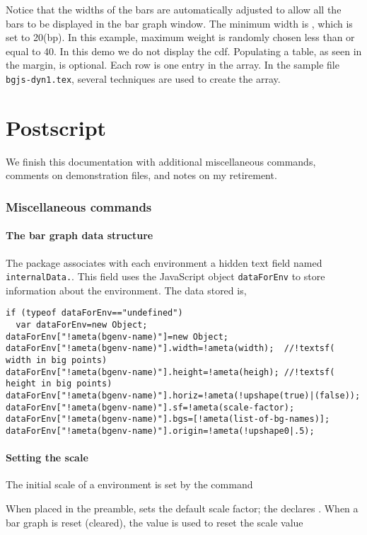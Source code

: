 \documentclass{article}
\let\uif\textsf
\begin{document}
Notice that the widths of the bars
  are automatically adjusted to allow all the bars to be displayed in the bar graph window. The minimum
  width is , which is set to 20(bp). In this example, maximum weight is randomly chosen less
  than or equal to 40. In this demo we do not display the \uif{cdf}. Populating a table, as seen in the margin,
  is optional. Each row is one entry in the  array. In the sample file \texttt{bgjs-dyn1.tex}, several
  techniques are used to create the  array.

\part{Postscript}

We finish this documentation with additional miscellaneous commands, comments
on demonstration files, and notes on my retirement.

\section{Miscellaneous commands}

\subsection{The bar graph data structure}

The  package associates with each 
environment a hidden text field named \texttt{internalData.}.
This field uses the JavaScript object \texttt{dataForEnv} to store information
about the environment. The data stored is,
\begin{Verbatim}[commandchars=!()]
if (typeof dataForEnv=="undefined")
  var dataForEnv=new Object;
dataForEnv["!ameta(bgenv-name)"]=new Object;
dataForEnv["!ameta(bgenv-name)"].width=!ameta(width);  //!textsf( width in big points)
dataForEnv["!ameta(bgenv-name)"].height=!ameta(heigh); //!textsf( height in big points)
dataForEnv["!ameta(bgenv-name)"].horiz=!ameta(!upshape(true)|(false));
dataForEnv["!ameta(bgenv-name)"].sf=!ameta(scale-factor);
dataForEnv["!ameta(bgenv-name)"].bgs=[!ameta(list-of-bg-names)];
dataForEnv["!ameta(bgenv-name)"].origin=!ameta(!upshape0|.5);
\end{Verbatim}

\subsection{Setting the scale} The initial scale of a  environment is set
by the command
\bVerb{}%
\begin{dCmd}[commandchars=!()]{\bxSize}
\end{dCmd}
\eVerb When placed in the preamble,  sets the default
scale factor; the  declares .
When a bar graph is reset (cleared), the value  is used to
reset the scale value
\end{document}
